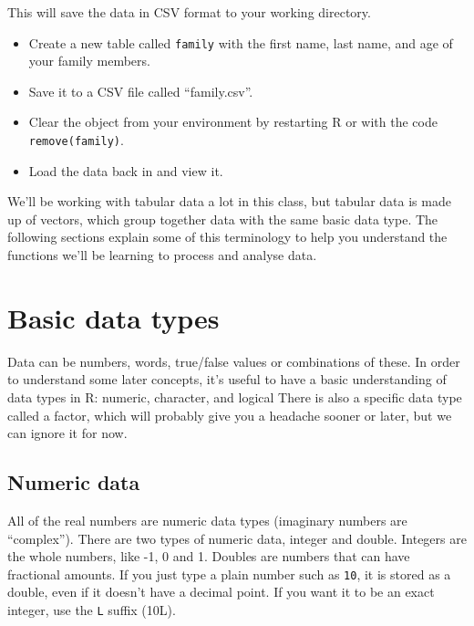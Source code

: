 \documentclass[
  oneside]{book}
\providecommand{\tightlist}{%
  \setlength{\itemsep}{0pt}\setlength{\parskip}{0pt}}
\begin{document}
This will save the data in CSV format to your working directory.

\begin{try}

\begin{itemize}
\tightlist
\item
  Create a new table called \texttt{family} with the first name, last name, and age of your family members.
\item
  Save it to a CSV file called ``family.csv''.
\item
  Clear the object from your environment by restarting R or with the code \texttt{remove(family)}.
\item
  Load the data back in and view it.
\end{itemize}

\end{try}

We'll be working with tabular data a lot in this class, but tabular data is made up of vectors, which group together data with the same basic data type. The following sections explain some of this terminology to help you understand the functions we'll be learning to process and analyse data.

\hypertarget{data_types}{%
\section{Basic data types}\label{data_types}}

Data can be numbers, words, true/false values or combinations of these. In order to understand some later concepts, it's useful to have a basic understanding of data types in R: numeric, character, and logical There is also a specific data type called a factor, which will probably give you a headache sooner or later, but we can ignore it for now.

\hypertarget{numeric-data}{%
\subsection{Numeric data}\label{numeric-data}}

All of the real numbers are numeric data types (imaginary numbers are ``complex''). There are two types of numeric data, integer and double. Integers are the whole numbers, like -1, 0 and 1. Doubles are numbers that can have fractional amounts. If you just type a plain number such as \texttt{10}, it is stored as a double, even if it doesn't have a decimal point. If you want it to be an exact integer, use the \texttt{L} suffix (10L).
\end{document}
